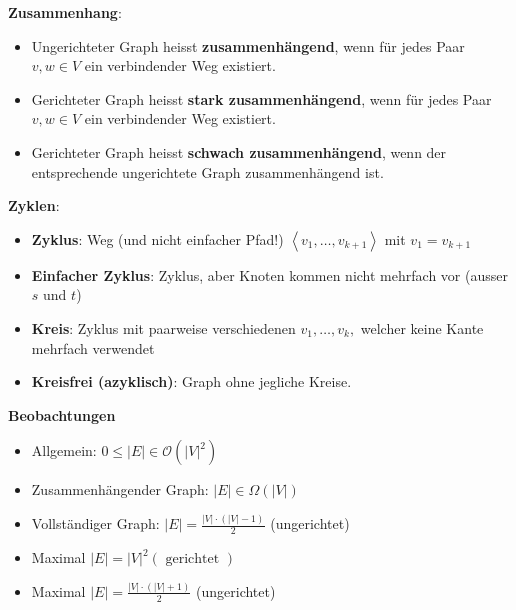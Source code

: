 \vspace{-4pt}
\begin{sectionbox}
\textbf{Zusammenhang}:\par
\begin{itemize}
    \item Ungerichteter Graph heisst \textbf{zusammenhängend}, wenn für jedes Paar $v, w \in V$ ein verbindender Weg existiert.
    \item Gerichteter Graph heisst \textbf{stark zusammenhängend}, wenn für jedes Paar $v, w \in V$ ein verbindender Weg existiert.
    \item Gerichteter Graph heisst \textbf{schwach zusammenhängend}, wenn der entsprechende ungerichtete Graph zusammenhängend ist.
\end{itemize}\par\smallskip

\end{sectionbox}
\vspace{-4pt}
\begin{sectionbox}
\textbf{Zyklen}:\par
\begin{itemize}
    \item \textbf{Zyklus}: Weg (und nicht einfacher Pfad!) $\left\langle v_{1}, \ldots, v_{k+1}\right\rangle$ mit $v_{1}=v_{k+1}$
    \item \textbf{Einfacher Zyklus}: Zyklus, aber Knoten kommen nicht mehrfach vor (ausser $s$ und $t$)
    \item \textbf{Kreis}: Zyklus mit paarweise verschiedenen $v_{1}, \ldots, v_{k},$ welcher keine Kante mehrfach verwendet
    \item \textbf{Kreisfrei (azyklisch)}: Graph ohne jegliche Kreise.
\end{itemize}\par

\end{sectionbox}
\vspace{-4pt}
\begin{sectionbox}
\textbf{Beobachtungen}\par
\begin{itemize}
    \item Allgemein: $0 \leq|E| \in \mathcal{O}\left(|V|^{2}\right)$
    \item Zusammenhängender Graph: $|E| \in \Omega(|V|)$
    \item Vollständiger Graph: $|E|=\frac{|V| \cdot(|V|-1)}{2}$ (ungerichtet)
    \item Maximal $|E|=|V|^{2}(\text { gerichtet })$
    \item Maximal $|E|=\frac{|V| \cdot(|V|+1)}{2}$ (ungerichtet)
\end{itemize}\par\smallskip
\end{sectionbox}

